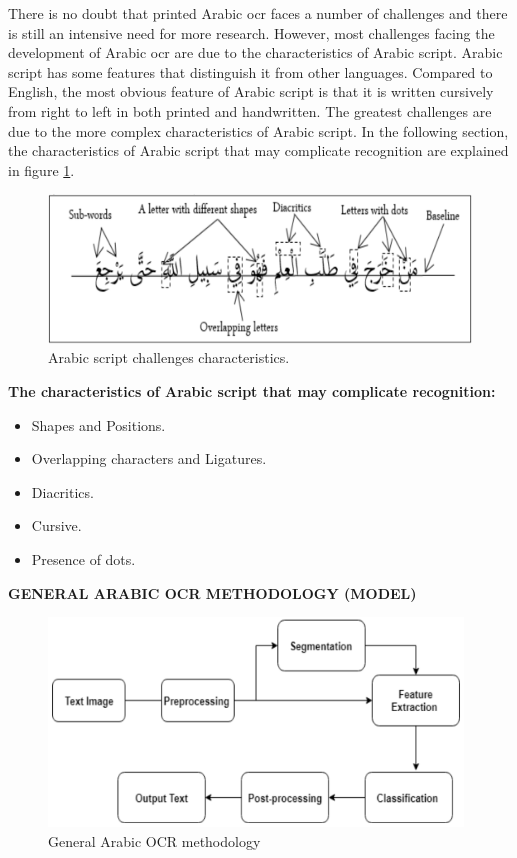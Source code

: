 There is no doubt that printed Arabic \acrshort{ocr} faces a number of challenges and there is still an intensive need for more research. However, most challenges facing the development of Arabic \acrshort{ocr} are due to the characteristics of Arabic script. Arabic script has some features that distinguish it from other languages. Compared to English, the most obvious feature of Arabic script is that it is written cursively from right to left in both printed and handwritten. The greatest challenges are due to the more complex characteristics of Arabic script. In the following section, the characteristics of Arabic script that may complicate recognition are explained in figure \ref{fig:ocr2}.

\begin{figure}[!htb]
    \centering
    \includegraphics[width=13cm]{images/ocr2.png}
    \caption{Arabic script challenges characteristics.}
    \label{fig:ocr2}
\end{figure}


\textbf{The characteristics of Arabic script that may complicate recognition:}
    \begin{itemize}[itemsep=1pt, topsep=5pt]
        \item   Shapes and Positions.
        \item   Overlapping characters and Ligatures.
        \item   Diacritics.
        \item   Cursive.
        \item   Presence of dots.
    \end{itemize}  

\textbf{GENERAL ARABIC OCR METHODOLOGY (MODEL)}
\begin{figure}[H]
    \centering
    \includegraphics[width=11cm]{images/ocr3.png}
    \caption{General Arabic OCR methodology}
    \label{fig:ocr3}
\end{figure}

